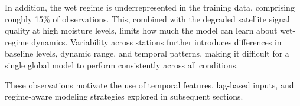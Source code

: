 In addition, the wet regime is underrepresented in the training data, comprising roughly 15\% of observations. This, combined with the degraded satellite signal quality at high moisture levels, limits how much the model can learn about wet-regime dynamics. Variability across stations further introduces differences in baseline levels, dynamic range, and temporal patterns, making it difficult for a single global model to perform consistently across all conditions.

These observations motivate the use of temporal features, lag-based inputs, and regime-aware modeling strategies explored in subsequent sections.
